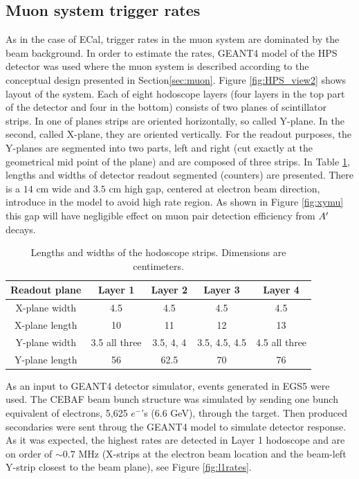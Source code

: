 \subsection{Muon system trigger rates}
\label{sec:muontrigg}

As in the case of ECal, trigger rates in the muon system are dominated by the beam background. In order to estimate the rates, GEANT4 model of the HPS detector was used where the muon system is described according to the conceptual design presented in Section\ref{sec:muon}. Figure \ref{fig:HPS_view2} shows layout of the system. Each of eight hodoscope layers (four layers in the top part of the detector and four in the bottom) consists of two planes of scintillator strips. In one of planes strips are oriented horizontally, so called Y-plane. In the second, called X-plane, they are oriented vertically. For the readout purposes, the Y-planes are segmented into two parts, left and right (cut exactly at the geometrical mid point of the plane) and are composed of three strips. In Table \ref{tb:muonstrp}, lengths and widths of detector readout segmented (counters) are presented. There is a $14$ cm wide and $3.5$ cm high gap, centered at electron beam direction, introduce in the model to avoid high rate region. As shown in Figure \ref{fig:xymu} this gap will have negligible effect on muon pair detection efficiency from $A^\prime$ decays.

\begin{table}[htdp]
\caption{Lengths and widths of the hodoscope strips. Dimensions are centimeters.}
\begin{center}
\begin{tabular}{|c|c|c|c|c|}
\hline\hline
Readout plane& Layer 1&Layer 2&Layer 3& Layer 4 \\
\hline
X-plane width& 4.5& 4.5 & 4.5 & 4.5  \\
X-plane length&10&11&12&13\\
\hline
Y-plane width& 3.5 all three&3.5, 4, 4  & 3.5, 4.5, 4.5 & 4.5 all three\\
Y-plane length&56&62.5&70&76\\
\hline\hline
\end{tabular}
\end{center}
\label{tb:muonstrp}
\end{table}%

As an input to GEANT4 detector simulator, events generated in EGS5 were used. The CEBAF beam bunch structure was simulated by sending one bunch 
equivalent of electrons, 5,625 $e^-$'s (6.6 GeV), through 
the target. Then produced secondaries were sent throug the GEANT4 model to simulate detector response. As it was expected, the highest rates are detected in Layer 1 hodoscope and are on order of $\sim 0.7$ MHz (X-strips at the electron beam location and the beam-left Y-strip closest to the beam plane), see Figure \ref{fig:l1rates}. 

